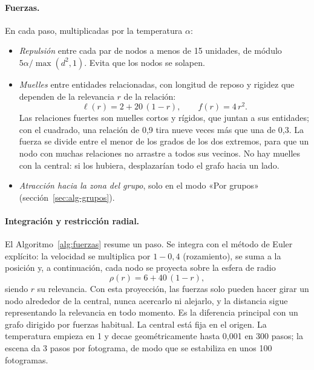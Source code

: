 \paragraph{Fuerzas.} En cada paso, multiplicadas por la temperatura $\alpha$:
\begin{itemize}
  \item \emph{Repulsión} entre cada par de nodos a menos de 15 unidades, de módulo $5\alpha/\max(d^2,1)$. Evita que los nodos se solapen.
  \item \emph{Muelles} entre entidades relacionadas, con longitud de reposo y rigidez que dependen de la relevancia $r$ de la relación:
  \begin{equation}
    \ell(r) = 2 + 20\,(1-r), \qquad f(r) = 4\,r^2 .
  \end{equation}
  Las relaciones fuertes son muelles cortos y rígidos, que juntan a sus entidades; con el cuadrado, una relación de 0,9 tira nueve veces más que una de 0,3. La fuerza se divide entre el menor de los grados de los dos extremos, para que un nodo con muchas relaciones no arrastre a todos sus vecinos. No hay muelles con la central: si los hubiera, desplazarían todo el grafo hacia un lado.
  \item \emph{Atracción hacia la zona del grupo}, solo en el modo «Por grupos» (sección~\ref{sec:alg-grupos}).
\end{itemize}

\paragraph{Integración y restricción radial.} El Algoritmo~\ref{alg:fuerzas} resume un paso. Se integra con el método de Euler explícito: la velocidad se multiplica por $1-0{,}4$ (rozamiento), se suma a la posición y, a continuación, cada nodo se proyecta sobre la esfera de radio
\begin{equation}
  \rho(r) = 6 + 40\,(1-r),
\end{equation}
siendo $r$ su relevancia. Con esta proyección, las fuerzas solo pueden hacer girar un nodo alrededor de la central, nunca acercarlo ni alejarlo, y la distancia sigue representando la relevancia en todo momento. Es la diferencia principal con un grafo dirigido por fuerzas habitual. La central está fija en el origen. La temperatura empieza en 1 y decae geométricamente hasta 0,001 en 300 pasos; la escena da 3 pasos por fotograma, de modo que se estabiliza en unos 100 fotogramas.


